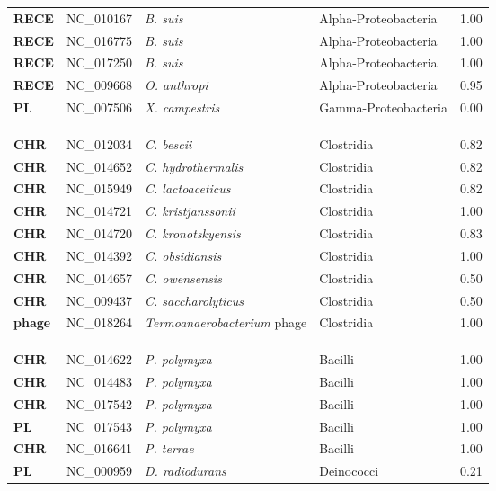 \begin{adjustwidth}{-3cm}{2cm}
{\begin{supertabular}{>{\bfseries}l|p{0.1\textwidth}p{0.14\textwidth}l|l}
RECE & NC\_010167 & \textit{B. suis} & Alpha-Proteobacteria & 1.00\\
RECE & NC\_016775 & \textit{B. suis} & Alpha-Proteobacteria & 1.00\\
RECE & NC\_017250 & \textit{B. suis} & Alpha-Proteobacteria & 1.00\\
RECE & NC\_009668 & \textit{O. anthropi} & Alpha-Proteobacteria & 0.95\\
PL & NC\_007506 & \textit{X. campestris} & Gamma-Proteobacteria & 0.00\\
\\
\\
\hline\\
CHR & NC\_012034 & \textit{C. bescii} & Clostridia & 0.82\\
CHR & NC\_014652 & \textit{C. hydrothermalis} & Clostridia & 0.82\\
CHR & NC\_015949 & \textit{C. lactoaceticus} & Clostridia & 0.82\\
CHR & NC\_014721 & \textit{C. kristjanssonii} & Clostridia & 1.00\\
CHR & NC\_014720 & \textit{C. kronotskyensis} & Clostridia & 0.83\\
CHR & NC\_014392 & \textit{C. obsidiansis} & Clostridia & 1.00\\
CHR & NC\_014657 & \textit{C. owensensis} & Clostridia & 0.50\\
CHR & NC\_009437 & \textit{C. saccharolyticus} & Clostridia & 0.50\\
phage & NC\_018264 & \textit{Termoanaerobacterium} phage & Clostridia & 1.00\\
\\
\\
\hline\\
CHR & NC\_014622 &  \textit{P. polymyxa} & Bacilli & 1.00\\
CHR & NC\_014483 &  \textit{P. polymyxa} & Bacilli & 1.00\\
CHR & NC\_017542 &  \textit{P. polymyxa} & Bacilli & 1.00\\
PL & NC\_017543 &  \textit{P. polymyxa} & Bacilli & 1.00\\
CHR & NC\_016641 &  \textit{P. terrae} & Bacilli & 1.00\\
PL & NC\_000959 &  \textit{D. radiodurans} & Deinococci & 0.21\\

\end{supertabular}}
\end{adjustwidth}
